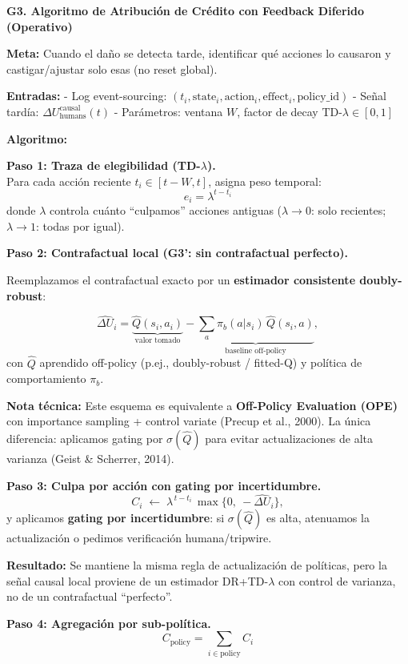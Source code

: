 \textbf{G3. Algoritmo de Atribución de Crédito con Feedback Diferido
(Operativo)}

\textbf{Meta:} Cuando el daño se detecta tarde, identificar qué acciones
lo causaron y castigar/ajustar solo esas (no reset global).

\textbf{Entradas:} - Log event-sourcing:
\((t_i, \text{state}_i, \text{action}_i, \text{effect}_i, \text{policy\_id})\)
- Señal tardía: \(\Delta U_{\text{humans}}^{\text{causal}}(t)\) -
Parámetros: ventana \(W\), factor de decay TD-\(\lambda \in [0,1]\)

\textbf{Algoritmo:}

\textbf{Paso 1: Traza de elegibilidad (TD-\(\lambda\)).}\\
Para cada acción reciente \(t_i \in [t-W, t]\), asigna peso temporal: \[
e_i = \lambda^{t - t_i}
\] donde \(\lambda\) controla cuánto ``culpamos'' acciones antiguas
(\(\lambda \to 0\): solo recientes; \(\lambda \to 1\): todas por igual).

\textbf{Paso 2: Contrafactual local (G3': sin contrafactual perfecto).}

Reemplazamos el contrafactual exacto por un \textbf{estimador
consistente doubly-robust}:

\[
\widehat{\Delta U}_i
=\underbrace{\hat Q(s_i,a_i)}_{\text{valor tomado}}
-\underbrace{\sum_{a}\pi_b(a|s_i)\,\hat Q(s_i,a)}_{\text{baseline off-policy}},
\] con \(\hat Q\) aprendido off-policy (p.ej., doubly-robust / fitted-Q)
y política de comportamiento \(\pi_b\).

\textbf{Nota técnica:} Este esquema es equivalente a \textbf{Off-Policy
Evaluation (OPE)} con importance sampling + control variate (Precup et
al., 2000). La única diferencia: aplicamos gating por \(\sigma(\hat Q)\)
para evitar actualizaciones de alta varianza (Geist \& Scherrer, 2014).

\textbf{Paso 3: Culpa por acción con gating por incertidumbre.}\\
\[
C_i \;\leftarrow\; \lambda^{\,t-t_i}\,\max\{0,\ -\widehat{\Delta U}_i\},
\] y aplicamos \textbf{gating por incertidumbre}: si \(\sigma(\hat Q)\)
es alta, atenuamos la actualización o pedimos verificación
humana/tripwire.

\textbf{Resultado:} Se mantiene la misma regla de actualización de
políticas, pero la señal causal local proviene de un estimador
DR+TD-\(\lambda\) con control de varianza, no de un contrafactual
``perfecto''.

\textbf{Paso 4: Agregación por sub-política.}\\
\[
C_{\text{policy}} = \sum_{i \in \text{policy}} C_i
\]

